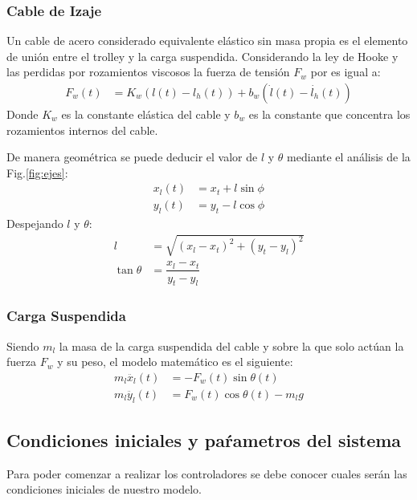 \documentclass[journal]{IEEEtran}
\begin{document}
\subsubsection{Cable de Izaje}
\label{subsec:cable}
Un cable de acero considerado equivalente elástico sin masa
propia es el elemento de unión entre el trolley y la carga
suspendida. Considerando la ley de Hooke y 
las perdidas por rozamientos viscosos la fuerza de tensión 
$F_w$ por es igual a:
\begin{align}
    F_w(t) &= K_w (l(t)-l_h(t)) + b_w(\dot{l}(t)-\dot{l_h}(t))
\end{align}
Donde $K_w$ es la constante elástica del cable y $b_w$ es la
constante que concentra los rozamientos internos del cable.

De manera geométrica se puede deducir el valor de $l$ y $\theta$ 
mediante el análisis de la Fig.\ref{fig:ejes}:
\begin{align}
    x_l(t) &=  x_t + l \sin \phi \\
    y_l(t) &=  y_t - l \cos \phi 
\end{align}
Despejando $l$ y $\theta$:
\begin{align}
    l &= \sqrt{(x_l - x_t)^2 + (y_t - y_l)^2} \\
    \tan \theta &= \dfrac{x_l - x_t}{y_t - y_l}
\end{align}

\subsubsection{Carga Suspendida}
Siendo $m_l$ la masa de la carga suspendida del cable
y sobre la que solo actúan la fuerza $F_w$ y
su peso, el modelo matemático es el siguiente:
\begin{align}
    m_l \ddot{x_l}(t) &=  -F_w(t) \sin \theta(t) \\
    m_l \ddot{y_l}(t) &=  F_w(t) \cos \theta(t) - m_l g 
\end{align}

\subsection{Condiciones iniciales y  paŕametros del sistema}

Para poder comenzar a realizar los controladores se debe conocer cuales serán las condiciones
iniciales de nuestro modelo.
\end{document}

